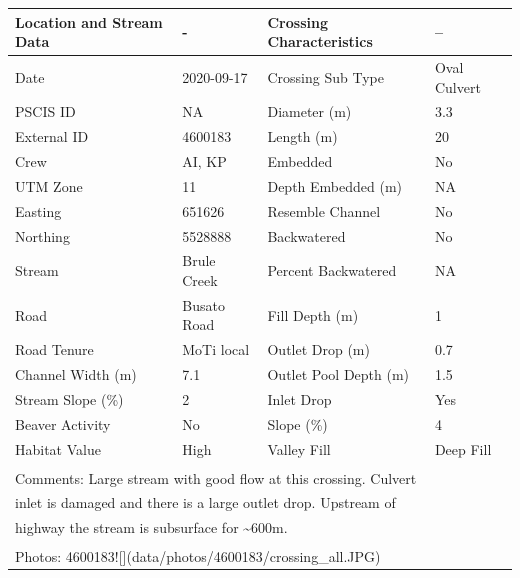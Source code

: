 \documentclass[
]{book}
\begin{document}
\begin{tabular}{l|l|l|l}
\hline
Location and Stream Data & - & Crossing Characteristics & --\\
\hline
Date & 2020-09-17 & Crossing Sub Type & Oval Culvert\\
\hline
PSCIS ID & NA & Diameter (m) & 3.3\\
\hline
External ID & 4600183 & Length (m) & 20\\
\hline
Crew & AI, KP & Embedded & No\\
\hline
UTM Zone & 11 & Depth Embedded (m) & NA\\
\hline
Easting & 651626 & Resemble Channel & No\\
\hline
Northing & 5528888 & Backwatered & No\\
\hline
Stream & Brule Creek & Percent Backwatered & NA\\
\hline
Road & Busato Road & Fill Depth (m) & 1\\
\hline
Road Tenure & MoTi local & Outlet Drop (m) & 0.7\\
\hline
Channel Width (m) & 7.1 & Outlet Pool Depth (m) & 1.5\\
\hline
Stream Slope (\%) & 2 & Inlet Drop & Yes\\
\hline
Beaver Activity & No & Slope (\%) & 4\\
\hline
Habitat Value & High & Valley Fill & Deep Fill\\
\hline
\multicolumn{4}{l}{\textsuperscript{} Comments: Large stream with good flow at this crossing. Culvert}\\
\multicolumn{4}{l}{inlet is damaged and there is a large outlet drop. Upstream of}\\
\multicolumn{4}{l}{highway the stream is subsurface for \textasciitilde{}600m.}\\
\multicolumn{4}{l}{\textsuperscript{} Photos: 4600183![](data/photos/4600183/crossing\_all.JPG)}\\
\end{tabular}
\end{document}
